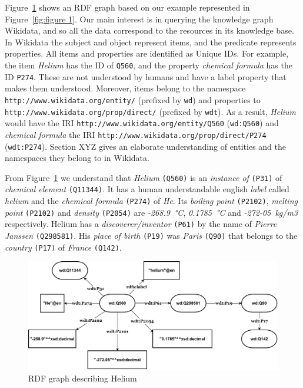 \documentclass[12 pt, a4paper]{report}
\theoremstyle{definition}
\begin{document}
Figure~\ref{fig:figure 2} shows an RDF graph based on our example represented in Figure~\ref{fig:figure 1}. Our main interest is in querying the knowledge graph Wikidata, and so all the data correspond to the resources in its knowledge base. In Wikidata the subject and object represent items, and the predicate represents properties. All items and properties are identified as Unique IDs. For example, the item \textit{Helium} has the ID of \texttt{Q560}, and the property \textit{chemical formula} has the ID \texttt{P274}. These are not understood by humans and have a label property that makes them understood. Moreover, items belong to the namespace \texttt{http://www.wikidata.org/entity/} (prefixed by \texttt{wd}) and properties to \texttt{http://www.wikidata.org/prop/direct/} (prefixed by \texttt{wdt}). As a result, \textit{Helium} would have the IRI \texttt{http://www.wikidata.org/entity/Q560} (\texttt{wd:Q560}) and \textit{chemical formula} the IRI \texttt{http://www.wikidata.org/prop/direct/P274} (\texttt{wdt:P274}). Section XYZ gives an elaborate understanding of entities and the namespaces they belong to in Wikidata.

From Figure~\ref{fig:figure 2} we understand that \textit{Helium} \texttt{(\gls{Q560})} is an \textit{instance of} \texttt{(P31)} of \textit{chemical element} \texttt{(Q11344)}. It has a human understandable english \textit{label} called \textit{helium} and the \textit{chemical formula} \texttt{(P274)} of \textit{He}. Its \textit{boiling point} \texttt{(P2102)}, \textit{melting point} \texttt{(P2102)} and \textit{density} \texttt{(P2054)} are \textit{-268.9~°C}, \textit{0.1785~°C} and \textit{-272-05~kg/m3} respectively. Helium has a \textit{discoverer/inventor} \texttt{(P61)} by the name of \textit{Pierre Janssen} \texttt{(Q298581)}. His \textit{place of birth} \texttt{(P19)} was \textit{Paris} \texttt{(Q90)} that belongs to the \textit{country} \texttt{(P17)} of \textit{France} \texttt{(Q142)}.

\begin{figure}[h]
  \centering
  \includegraphics[width=0.75 \linewidth]{images/rdf_graph.drawio.pdf}
  \caption{RDF graph describing Helium}
  \label{fig:figure 2}
\end{figure}
\end{document}
